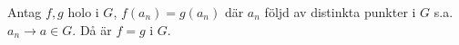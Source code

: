 \begin{theorem}[Identitetsprincipen]
Antag $f, g$ holo i $G$, $f(a_n) = g(a_n)$ där $a_n$ följd av distinkta punkter i $G$ s.a.\ $a_n \to a \in G$.
Då är $f = g$ i $G$.
\end{theorem}
